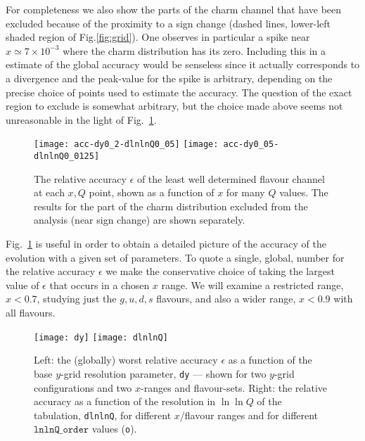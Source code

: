 \documentclass[12pt]{article}
\newcommand{\ttt}[1]{\texttt{#1}}
\begin{document}
For completeness we also show the parts of the charm channel that have
been excluded because of the proximity to a sign change (dashed lines,
lower-left shaded region of Fig.\ref{fig:grid}).  One observes in
particular a spike near $x\simeq 7 \times 10^{-3}$ where the charm
distribution has its zero. Including this in a estimate of the global
accuracy would be senseless since it actually corresponds to a
divergence and the peak-value for the spike is arbitrary, depending on
the precise choice of points used to estimate the accuracy. The
question of the exact region to exclude is somewhat arbitrary, but the
choice made above seems not unreasonable in the light of
Fig.~\ref{fig:acc-fixed-dy-dlnlnQ}.

\begin{figure}
  \centering
  \texttt{[image: acc-dy0\_2-dlnlnQ0\_05]}\hfill
  \texttt{[image: acc-dy0\_05-dlnlnQ0\_0125]}
  \caption{The relative accuracy $\epsilon$ of the least well
    determined flavour channel at each $x, Q$ point, shown as a
    function of $x$ for many $Q$ values. The results for the part of
    the charm distribution excluded from the analysis (near sign
    change) are shown separately. }
  \label{fig:acc-fixed-dy-dlnlnQ}
\end{figure}

Fig.~\ref{fig:acc-fixed-dy-dlnlnQ} is useful in order to obtain a
detailed picture of the accuracy of the evolution with a given set of
parameters. To quote a single, global, number for the relative 
accuracy $\epsilon$ we make
the conservative choice of taking the largest value of $\epsilon$ that
occurs in a chosen $x$ range. We will examine a restricted range,
$x<0.7$, studying just the $g,u,d,s$ flavours, and also a wider range,
$x<0.9$ with all flavours.

\begin{figure}
  \centering
  \texttt{[image: dy]}%
  \hfill
  \texttt{[image: dlnlnQ]}%
  \caption{Left: the (globally) worst relative accuracy $\epsilon$ as
    a function of the base $y$-grid resolution parameter, \ttt{dy} ---
    shown for two $y$-grid configurations and two $x$-ranges and
    flavour-sets.
  Right: the relative accuracy as a function of the
    resolution in $\ln \ln Q$ of the tabulation, \ttt{dlnlnQ}, for
    different $x$/flavour ranges and for different $\ttt{lnlnQ\_order}$
    values (\ttt{o}).}
  \label{fig:dy+dlnlnQ}
\end{figure}
\end{document}
